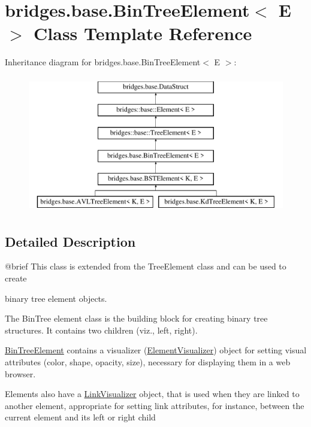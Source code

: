 \hypertarget{classbridges_1_1base_1_1_bin_tree_element}{}\section{bridges.\+base.\+Bin\+Tree\+Element$<$ E $>$ Class Template Reference}
\label{classbridges_1_1base_1_1_bin_tree_element}
Inheritance diagram for bridges.\+base.\+Bin\+Tree\+Element$<$ E $>$\+:\begin{figure}[H]
\begin{center}
\leavevmode
\includegraphics[height=6.000000cm]{classbridges_1_1base_1_1_bin_tree_element}
\end{center}
\end{figure}


\subsection{Detailed Description}
\begin{DoxyVerb}@brief This class is extended from the TreeElement class  and can be used to create
\end{DoxyVerb}
 binary tree element objects.

The Bin\+Tree element class is the building block for creating binary tree structures. It contains two children (viz., left, right).

\mbox{\hyperlink{classbridges_1_1base_1_1_bin_tree_element}{Bin\+Tree\+Element}} contains a visualizer (\mbox{\hyperlink{classbridges_1_1base_1_1_element_visualizer}{Element\+Visualizer}}) object for setting visual attributes (color, shape, opacity, size), necessary for displaying them in a web browser.

Elements also have a \mbox{\hyperlink{classbridges_1_1base_1_1_link_visualizer}{Link\+Visualizer}} object, that is used when they are linked to another element, appropriate for setting link attributes, for instance, between the current element and its left or right child


